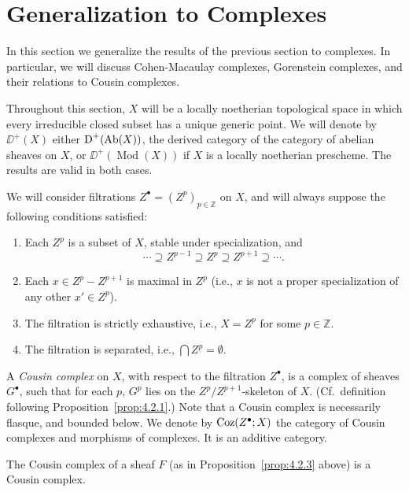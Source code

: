 \section{Generalization to Complexes}\label{sec:4.3}

In this section we generalize the results of the previous section to complexes. In particular, we will discuss Cohen-Macaulay complexes, Gorenstein complexes, and their relations to Cousin complexes.

Throughout this section, $X$ will be a locally noetherian topological space in which every irreducible closed subset has a unique generic point. We will denote by $\DD^+(X)$ either $\operatorname{D}^+(\operatorname{Ab}(X))$, the derived category of the category of abelian sheaves on $X$, or $\DD^+(\operatorname{Mod}(X))$ if $X$ is a locally noetherian prescheme. The results are valid in both cases.

We will consider filtrations $Z^\bullet=(Z^p)_{p\in\mathbb{Z}}$ on $X$, and will always suppose the following conditions satisfied:
\begin{enumerate}
\item[(1)] Each $Z^p$ is a subset of $X$, stable under specialization, and
\[
\cdots\supseteq Z^{p-1}\supseteq Z^p\supseteq Z^{p+1}\supseteq\cdots.
\]
\item[(2)] Each $x\in Z^{p}-Z^{p+1}$ is maximal in $Z^{p}$ (i.e., $x$ is not a proper specialization of any other $x'\in Z^{p}$).
\item[(3)] The filtration is strictly exhaustive, i.e., $X=Z^p$ for some $p\in\mathbb{Z}$.
\item[(4)] The filtration is separated, i.e., $\bigcap Z^p=\emptyset$.
\end{enumerate}

\begin{definition*}
A \emph{Cousin complex} on $X$, with respect to the filtration $Z^\bullet$, is a complex of sheaves $G^\bullet$, such that for each $p$, $G^p$ lies on the $Z^p/Z^{p+1}$-skeleton of $X$. (Cf.\ definition following Proposition~\ref{prop:4.2.1}.) Note that a Cousin complex is necessarily flasque, and bounded below. We denote by $\operatorname{Coz}(Z^\bullet;X)$ the category of Cousin complexes and morphisms of complexes. It is an additive category.
\end{definition*}

\begin{example*}
The Cousin complex of a sheaf $F$ (as in Proposition~\ref{prop:4.2.3} above) is a Cousin complex.
\end{example*}


